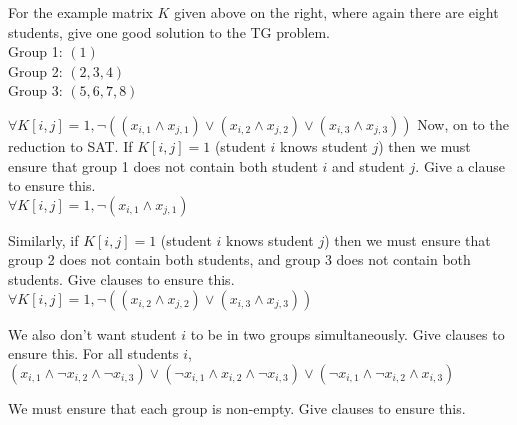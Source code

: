 \documentclass[11pt,fleqn]{exam}
\newif\ifsolutions\solutionsfalse
\newenvironment{soln}{\color{solnblue}}{}
\begin{document}
\begin{questions}
\question[2]
  For the example matrix $K$ given above on the right, where again there are eight students, give one good solution to the TG problem. \\
  \begin{soln}
      Group 1: $(1)$ \\
      Group 2: $(2, 3, 4)$ \\
      Group 3: $(5, 6, 7, 8)$
  \end{soln}

      \ifsolutions
      
      \fi
    $\forall K[i,j]=1, \neg ((x_{i,1}\wedge x_{j,1})\vee (x_{i,2}\wedge x_{j,2}) \vee (x_{i,3}\wedge x_{j,3}))$  
\question[2]
Now, on to the reduction to SAT. If $K[i,j] = 1$ (student $i$ knows student $j$) then we must ensure that
group 1 does not contain both student $i$ and student $j$.
Give a clause to ensure this. \\
\begin{soln}
    $\forall K[i,j]=1, \neg (x_{i,1}\wedge x_{j,1})$
\end{soln}

    \ifsolutions
    
    \fi
    
\question[2]
Similarly, if $K[i,j] = 1$ (student $i$ knows student $j$) then we must ensure
that group 2 does not contain both students, and group 3 does not contain both students.
Give clauses to ensure this. \\
\begin{soln}
    $\forall K[i,j]=1, \neg ((x_{i,2}\wedge x_{j,2}) \vee (x_{i,3}\wedge x_{j,3}))$
\end{soln}
    \ifsolutions
    
    \fi
    
\question[2]
We also don't want student $i$ to be in two groups simultaneously. Give clauses
to ensure this.
\begin{soln}
    For all students $i$, $(x_{i,1}\wedge \neg x_{i,2}\wedge \neg x_{i,3}) \vee (\neg x_{i,1}\wedge x_{i,2}\wedge \neg x_{i,3}) \vee (\neg x_{i,1}\wedge \neg x_{i,2}\wedge x_{i,3})$
\end{soln}
    \ifsolutions
    
    \fi

\question[2]
We must ensure that each group is non-empty. Give clauses to ensure this. \\

    \ifsolutions
    
    \fi
    

\end{questions}
\end{document}

